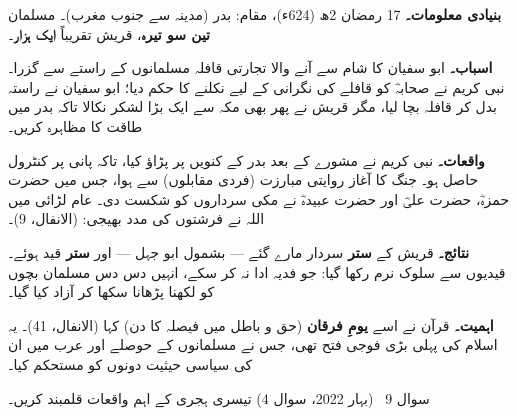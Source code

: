 \begin{hal}
\textbf{بنیادی معلومات۔} \textenglish{17} رمضان \textenglish{2}ھ
(\textenglish{624}ء)، مقام: بدر (مدینہ سے جنوب مغرب)۔ مسلمان
\textbf{تین سو تیرہ}، قریش تقریباً \textbf{ایک ہزار}۔

\medskip
\textbf{اسباب۔} ابو سفیان کا شام سے آنے والا تجارتی قافلہ مسلمانوں کے
راستے سے گزرا۔ نبی کریم \saw نے صحابہؓ کو قافلے کی نگرانی کے لیے نکلنے کا
حکم دیا؛ ابو سفیان نے راستہ بدل کر قافلہ بچا لیا، مگر قریش نے پھر بھی
مکہ سے ایک بڑا لشکر نکالا تاکہ بدر میں طاقت کا مظاہرہ کریں۔

\medskip
\textbf{واقعات۔} نبی کریم \saw نے مشورے کے بعد بدر کے کنویں پر پڑاؤ کیا،
تاکہ پانی پر کنٹرول حاصل ہو۔ جنگ کا آغاز روایتی مبارزت (فردی مقابلوں) سے
ہوا، جس میں حضرت حمزہؓ، حضرت علیؓ اور حضرت عبیدہؓ نے مکی سرداروں کو شکست
دی۔ عام لڑائی میں اللہ نے فرشتوں کی مدد بھیجی:  (الانفال، \textenglish{9})۔

\medskip
\textbf{نتائج۔} قریش کے \textbf{ستر} سردار مارے گئے --- بشمول ابو جہل ---
اور \textbf{ستر} قید ہوئے۔ قیدیوں سے سلوک نرم رکھا گیا: جو فدیہ ادا نہ کر
سکے، انہیں دس دس مسلمان بچوں کو لکھنا پڑھانا سکھا کر آزاد کیا گیا۔

\medskip
\textbf{اہمیت۔} قرآن نے اسے \textbf{یومِ فرقان} (حق و باطل میں فیصلہ کا
دن) کہا (الانفال، \textenglish{41})۔ یہ اسلام کی پہلی بڑی فوجی فتح تھی،
جس نے مسلمانوں کے حوصلے اور عرب میں ان کی سیاسی حیثیت دونوں کو مستحکم
کیا۔
\end{hal}

\begin{sawal}{سوال \textenglish{9} \ \textnormal{\small(بہار \textenglish{2022}، سوال \textenglish{4})}}
تیسری ہجری کے اہم واقعات قلمبند کریں۔
\end{sawal}


